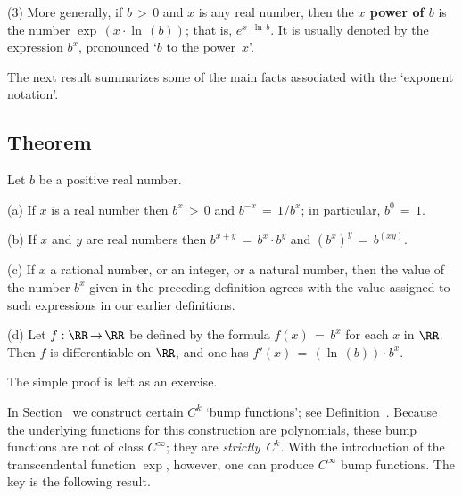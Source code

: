 \V

        (3) More generally, if $b\,>\,0$ and $x$ is any real number, then the {\bf $x$ power of $b$} is the number ${\exp}\,(x{\cdot}{\ln}\,(b))$;
    that is, $e^{x{\cdot}{\ln}\,b}$. It is usually denoted by the expression $b^{x}$, pronounced `$b$ to the power~$x$'.

\V

        The next result summarizes some of the main facts associated with the `exponent notation'.

\V

             \subsection{\small{\bf Theorem}}
            \label{ThmE45.127G}

\V

        Let $b$ be a positive real number.

\V

        (a) If $x$ is a real number then $b^{x}\,>\,0$ and $b^{-x} \,=\, 1/b^{x}$; in particular, $b^{0} \,=\, 1$.

\V

        (b) If $x$ and $y$ are real numbers then $b^{x+y} \,=\, b^{x}{\cdot}b^{y}$ and $\left(b^{x}\right)^{y} \,=\, b^{(xy)}$.

\V

        (c) If $x$ a rational number, or an integer, or a natural number, then the value of the number $b^{x}$ given in the preceding definition agrees with the value assigned to such expressions in our earlier definitions.

\V

        (d) Let $f:{\RR} \,{\rightarrow}\, {\RR}$ be defined by the formula $f(x) \,=\, b^{x}$ for each $x$ in ${\RR}$.
    Then $f$ is differentiable on ${\RR}$, and one has $f'(x) \,=\, \left({\ln}\,(b)\right){\cdot}b^{x}$.

\V

        The simple proof is left as an exercise. \Q

\VV

        In Section~ we construct certain $C^{k}$ `bump functions'; see Definition~.
    Because the underlying functions for this construction are polynomials, these bump functions are not of class $C^{{\infty}}$; they are {\em strictly}~$C^{k}$.
    With the introduction of the transcendental function $\exp$, however, one can produce $C^{{\infty}}$ bump functions.
    The key is the following result.

